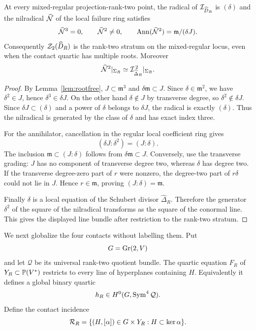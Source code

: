 \begin{theorem}
\label{thm:collision-depth}
At every mixed-regular projection-rank-two point,
the radical of $\mathcal I_{\widehat D_R}$ is $(\delta)$ and the nilradical
$\widehat{\mathcal N}$ of the local failure ring satisfies
\[
 \widehat{\mathcal N}^3=0,\qquad
 \widehat{\mathcal N}^2\ne0,\qquad
 \operatorname{Ann}(\widehat{\mathcal N}^2)=\mathfrak m/(\delta J).
\]
Consequently $\mathcal Z_2(\widehat D_R)$ is the rank-two stratum on the
mixed-regular locus, even when the contact quartic has multiple roots.
Moreover
\[
 \widehat{\mathcal N}^2|_{\Sigma_R}
 \simeq
 \mathcal I_{\widehat\Delta_R}^{\,2}|_{\Sigma_R}.
\]
\end{theorem}
\begin{proof}
By Lemma~\ref{lem:rootfree},
$J\subset\mathfrak m^3$ and
$\delta\mathfrak m\subset J$.  Since $\delta\in\mathfrak m^2$,
we have $\delta^2\in J$, hence
$\delta^3\in\delta J$.  On the other hand
$\delta\notin J$ by transverse degree, so
$\delta^2\notin\delta J$.  Since
$\delta J\subset(\delta)$ and a power of $\delta$ belongs to
$\delta J$, the radical is exactly $(\delta)$.  Thus the nilradical
is generated by the class of $\delta$ and has exact index three.

For the annihilator, cancellation in the regular local coefficient
ring gives
\[
 (\delta J:\delta^2)=(J:\delta).
\]
The inclusion $\mathfrak m\subset(J:\delta)$ follows from
$\delta\mathfrak m\subset J$.  Conversely, use the transverse grading:
$J$ has no component of transverse degree two, whereas $\delta$ has
degree two.  If the transverse degree-zero part of $r$ were nonzero,
the degree-two part of $r\delta$ could not lie in $J$.
Hence $r\in\mathfrak m$, proving
$(J:\delta)=\mathfrak m$.

Finally $\delta$ is a local equation of the Schubert divisor
$\widehat\Delta_R$.  Therefore the generator $\delta^2$ of the
square of the nilradical transforms as the square of the conormal
line.  This gives the displayed line bundle after restriction to the
rank-two stratum.
\end{proof}

We next globalize the four contacts without labelling them.  Put
\[
 G=\operatorname{Gr}(2,V)
\]
and let $\mathcal Q$ be its universal rank-two quotient bundle.
The quartic equation $F_R$ of $Y_R\subset\mathbb P(V^*)$ restricts to every
line of hyperplanes containing $H$.  Equivalently it defines a global
binary quartic
\begin{equation}\label{eq:universal-contact-quartic}
 h_R\in H^0(G,\operatorname{Sym}^4\mathcal Q).
\end{equation}
Define the contact incidence
\begin{equation}\label{eq:contact-cover}
 \mathcal R_R=
 \{(H,[\alpha])\in G\times Y_R:
                  H\subset\ker\alpha\}.
\end{equation}

